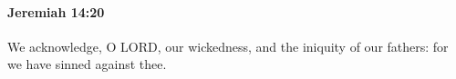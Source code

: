 
		\paragraph{Jeremiah 14:20} %
			\label{JEREMIAH-14-20}

			We acknowledge, O LORD, our wickedness, and the iniquity of our fathers: for we have sinned against thee.


